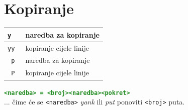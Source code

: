 \documentclass[10pt]{article}
\begin{document}
    \section*{\color{ForestGreen} Kopiranje}
    \begin{tabular}{|>{\tt}p{9.00cm}|>{}p{15.50cm}|}
        \hline
        y       & naredba za kopiranje                                   \\ \hline
        yy      & kopiranje cijele linije                                \\ \hline \hline
        p       & naredba za kopiranje                                   \\ \hline
        P       & kopiranje cijele linije                                \\ \hline
    \end{tabular}
    \begin{center}
        \large
        \textcolor{ForestGreen}{\texttt{\textbf{<naredba> = <broj><naredba><pokret>}}}
        \\
        ... čime će se \texttt{<naredba>} \textit{yank} ili \textit{put} ponoviti \texttt{<broj>} puta. 
    \end{center}
    \newpage

\end{document}
